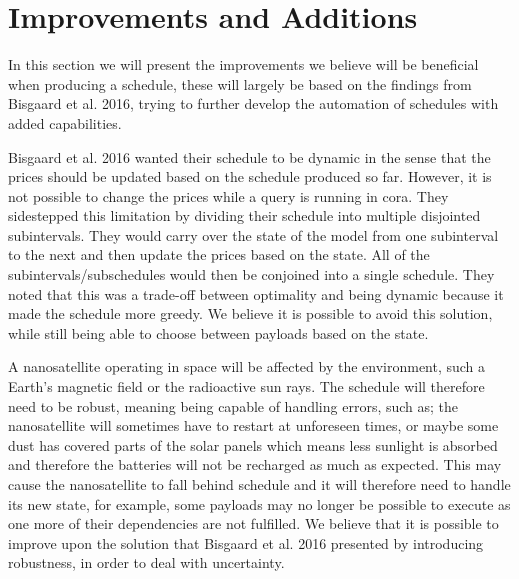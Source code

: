 \section{Improvements and Additions}\label{sec:imp_and_add}
In this section we will present the improvements we believe will be beneficial when producing a schedule, these will largely be based on the findings from Bisgaard et al. 2016\cite{gomx3}, trying to further develop the automation of schedules with added capabilities.

Bisgaard et al. 2016\cite{gomx3} wanted their schedule to be dynamic in the sense that the prices should be updated based on the schedule produced so far.
However, it is not possible to change the prices while a query is running in \gls{cora}.
They sidestepped this limitation by dividing their schedule into multiple disjointed subintervals. 
They would carry over the state of the model from one subinterval to the next and then update the prices based on the state.
All of the subintervals/subschedules would then be conjoined into a single schedule.
They noted that this was a trade-off between optimality and being dynamic because it made the schedule more greedy.
We believe it is possible to avoid this solution, while still being able to choose between payloads based on the state.

A nanosatellite operating in space will be affected by the environment, such a Earth's magnetic field or the radioactive sun rays.
The schedule will therefore need to be robust, meaning being capable of handling errors, such as; the nanosatellite will sometimes have to restart at unforeseen times, or maybe some dust has covered parts of the solar panels which means less sunlight is absorbed and therefore the batteries will not be recharged as much as expected.
This may cause the nanosatellite to fall behind schedule and it will therefore need to handle its new state, for example, some payloads may no longer be possible to execute as one more of their dependencies are not fulfilled. 
We believe that it is possible to improve upon the solution that Bisgaard et al. 2016\cite{gomx3} presented by introducing robustness, in order to deal with uncertainty.

